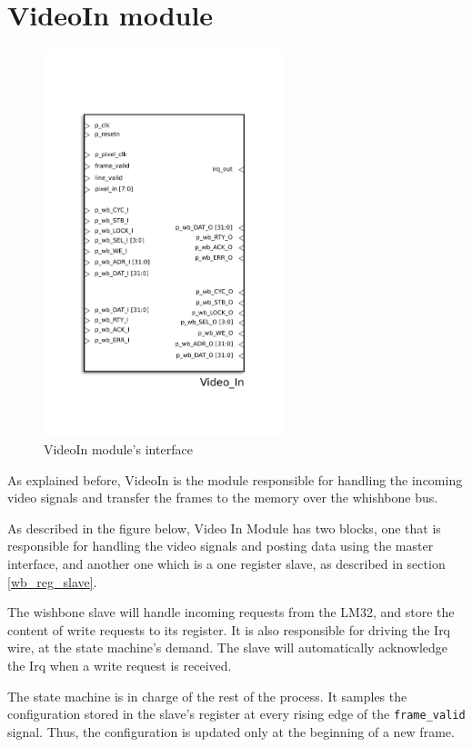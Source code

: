 
\section{VideoIn module}
\begin{figure}[H]
\center
\includegraphics[width=7cm]{figs/Video_in.pdf}
\caption{VideoIn module's interface}
\label{VideoIn_interface}
\end{figure}

As explained before, VideoIn is the module responsible for handling the incoming video signals and transfer the frames to the memory over the whishbone bus.

As described in the figure below, Video In Module has two blocks, one that is responsible for handling the video signals and posting data using the master interface, and another one which is a one register slave, as described in section \ref{wb_reg_slave}.

The wishbone slave will handle incoming requests from the LM32, and store the content of write requests to its register. It is also responsible for driving the Irq wire, at the state machine's demand.
The slave will automatically acknowledge the Irq when a write request is received.

The state machine is in charge of the rest of the process.
It samples the configuration stored in the slave's register at every rising edge of the \texttt{frame\_valid} signal. Thus, the configuration is updated only at the beginning of a new frame.

